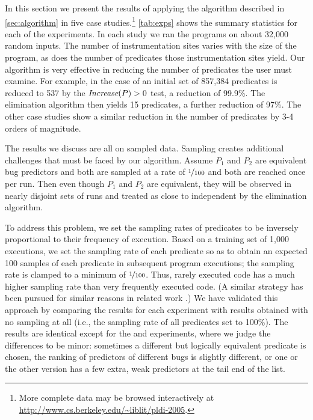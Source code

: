 


In this section we present the results of applying the algorithm
described in \autoref{sec:algorithm} in five case
studies.\footnote{More complete data may be browsed interactively at
  \url{http://www.cs.berkeley.edu/~liblit/pldi-2005}.}
\autoref{tab:exps} shows the summary statistics for each of the
experiments.  In each study we ran the programs on about 32,000 random
inputs.  The number of instrumentation sites varies with the size of
the program, as does the number of predicates those instrumentation
sites yield.  Our algorithm is very effective in reducing the number
of predicates the user must examine.  For example, in the case of
\rhythmbox an initial set of 857,384 predicates is reduced to 537 by the $\textit{Increase}(P) > 0$
test, a reduction of 99.9\%.  The elimination algorithm then yields 15 predicates, a further
reduction of 97\%.  The other case studies show a similar reduction in the number of
predicates by 3-4 orders of magnitude.

The results we discuss are all on sampled data.  Sampling creates
additional challenges that must be faced by our algorithm.  Assume $P_1$ and $P_2$ are
equivalent bug predictors and both are sampled at a rate of
$\nicefrac{1}{100}$ and both are reached once per run.  Then even though
$P_1$ and $P_2$ are equivalent, they will be observed in nearly disjoint
sets of runs and treated as close to independent by the elimination
algorithm.

To address this problem, we set the sampling rates of predicates to be
inversely proportional to their frequency of execution.  Based on a
training set of 1,000 executions, we set the sampling rate of each predicate so 
as to obtain an expected 100 samples of each predicate in subsequent program 
executions; the sampling rate is clamped to a minimum of $\nicefrac{1}{100}$.  
Thus, rarely executed code has a
much higher sampling rate than very frequently executed code.  (A
similar strategy has been pursued for similar reasons in related work \cite{chil04}.)  We
have validated this approach by comparing the results for each
experiment with results obtained with no sampling at all (i.e., the
sampling rate of all predicates set to 100\%).  The results are
identical except for the \rhythmbox and \moss experiments, where we
judge the differences to be minor: sometimes a different but logically
equivalent predicate is chosen, the ranking of predictors of different
bugs is slightly different, or one or the other version has a few
extra, weak predictors at the tail end of the list.  

